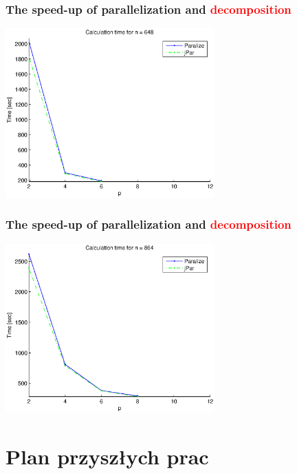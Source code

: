 \documentclass{beamer}
\begin{document}
\begin{frame}
\frametitle{The speed-up of parallelization and \textcolor{red}{decomposition}}
\centering
\includegraphics[height=6.5cm]{fig4}
\end{frame}
\begin{frame}
\frametitle{The speed-up of parallelization and \textcolor{red}{decomposition}}
\centering
\includegraphics[height=6.5cm]{fig5}
\end{frame}

\section{Plan przyszłych prac}
\end{document}

